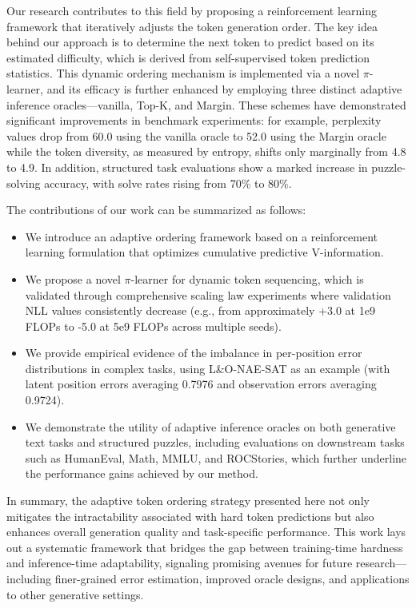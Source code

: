 \documentclass{article} %
\begin{document}
Our research contributes to this field by proposing a reinforcement learning framework that iteratively adjusts the token generation order. The key idea behind our approach is to determine the next token to predict based on its estimated difficulty, which is derived from self-supervised token prediction statistics. This dynamic ordering mechanism is implemented via a novel $\pi$-learner, and its efficacy is further enhanced by employing three distinct adaptive inference oracles—vanilla, Top-K, and Margin. These schemes have demonstrated significant improvements in benchmark experiments: for example, perplexity values drop from 60.0 using the vanilla oracle to 52.0 using the Margin oracle while the token diversity, as measured by entropy, shifts only marginally from 4.8 to 4.9. In addition, structured task evaluations show a marked increase in puzzle-solving accuracy, with solve rates rising from 70\% to 80\%.

The contributions of our work can be summarized as follows:
\begin{itemize}
    \item We introduce an adaptive ordering framework based on a reinforcement learning formulation that optimizes cumulative predictive V-information.
    \item We propose a novel $\pi$-learner for dynamic token sequencing, which is validated through comprehensive scaling law experiments where validation NLL values consistently decrease (e.g., from approximately +3.0 at 1e9 FLOPs to -5.0 at 5e9 FLOPs across multiple seeds).
    \item We provide empirical evidence of the imbalance in per-position error distributions in complex tasks, using L\&O-NAE-SAT as an example (with latent position errors averaging 0.7976 and observation errors averaging 0.9724).
    \item We demonstrate the utility of adaptive inference oracles on both generative text tasks and structured puzzles, including evaluations on downstream tasks such as HumanEval, Math, MMLU, and ROCStories, which further underline the performance gains achieved by our method.
\end{itemize}

In summary, the adaptive token ordering strategy presented here not only mitigates the intractability associated with hard token predictions but also enhances overall generation quality and task-specific performance. This work lays out a systematic framework that bridges the gap between training-time hardness and inference-time adaptability, signaling promising avenues for future research—including finer-grained error estimation, improved oracle designs, and applications to other generative settings.
\end{document}
